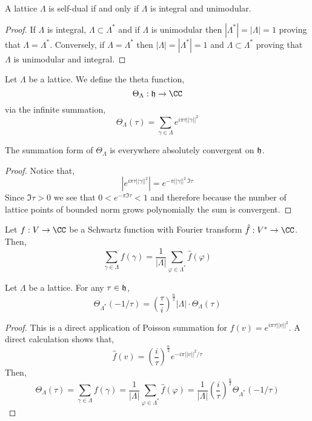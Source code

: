 \documentclass[12pt]{article}
\begin{document}
\begin{lemma}
A lattice $\Lambda$ is self-dual if and only if $\Lambda$ is integral and unimodular. 
\end{lemma}

\begin{proof}
If $\Lambda$ is integral, $\Lambda \subset \Lambda^*$ and if $\Lambda$ is unimodular then $|\Lambda^*| = |\Lambda| = 1$ proving that $\Lambda = \Lambda^*$. Conversely, if $\Lambda = \Lambda^*$ then $|\Lambda| = |\Lambda^*| = 1$ and $\Lambda \subset \Lambda^*$ proving that $\Lambda$ is unimodular and integral.
\end{proof}

\begin{defn}
Let $\Lambda$ be a lattice. We define the theta function,
\[ \Theta_{\Lambda} : \h \to \CC \]
via the infinite summation,
\[ \Theta_{\Lambda}(\tau) = \sum_{\gamma \in \Lambda} e^{i \pi \tau || \gamma ||^2} \]
\end{defn}


\begin{prop}
The summation form of $\Theta_{\Lambda}$ is everywhere absolutely convergent on $\mathfrak{h}$. 
\end{prop}

\begin{proof}
Notice that,
\[ | e^{i \pi \tau || \gamma ||^2} | = e^{- \pi || \gamma ||^2 \, \Im{\tau}} \]
Since $\Im{\tau} > 0$ we see that $0 < e^{-\pi \Im{\tau}} < 1$ and therefore because the number of lattice points of bounded norm grows polynomially the sum is convergent. 
\end{proof}

\begin{thm}
Let $f : V \to \CC$ be a Schwartz function with Fourier transform $\hat{f} : V^* \to \CC$. Then,
\[ \sum_{\gamma \in \Lambda} f(\gamma) = \frac{1}{|\Lambda|} \sum_{\varphi \in \Lambda^*} \hat{f}(\varphi) \]
\end{thm}

\begin{prop}
Let $\Lambda$ be a lattice. For any $\tau \in \mathfrak{h}$,
\[ \Theta_{\Lambda^*}(-1/\tau) = \left( \frac{\tau}{i} \right)^{\frac{n}{2}} | \Lambda | \cdot  \Theta_{\Lambda}(\tau) \]
\end{prop}

\begin{proof}
This is a direct application of Poisson summation for $f(v) = e^{i \pi \tau || v ||^2}$. A direct calculation shows that, 
\[ \hat{f}(v) = \left( \frac{i}{\tau} \right)^{\frac{n}{2}} e^{-i \pi || v ||^2 / \tau} \] 
Then,
\[ \Theta_{\Lambda}(\tau) = \sum_{\gamma \in \Lambda} f(\gamma) = \frac{1}{| \Lambda |} \sum_{\varphi \in \Lambda^*} \hat{f}(\varphi) = \frac{1}{|\Lambda|} \left( \frac{i}{\tau} \right)^{\frac{n}{2}} \Theta_{\Lambda^*}(-1/\tau) \]
\end{proof}
\end{document}
